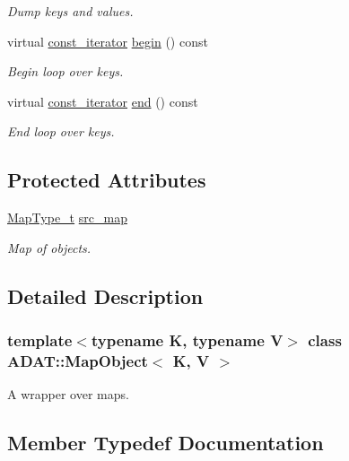\begin{DoxyCompactItemize}
\begin{DoxyCompactList}\small\item\em Dump keys and values. \end{DoxyCompactList}\item 
virtual \mbox{\hyperlink{classADAT_1_1MapObject_a4622cd7d3b6fed18fe226d28091cc6c8}{const\+\_\+iterator}} \mbox{\hyperlink{classADAT_1_1MapObject_a7f4f6830f0efcc2fcd7bb2aebe0b0c95}{begin}} () const
\begin{DoxyCompactList}\small\item\em Begin loop over keys. \end{DoxyCompactList}\item 
virtual \mbox{\hyperlink{classADAT_1_1MapObject_a4622cd7d3b6fed18fe226d28091cc6c8}{const\+\_\+iterator}} \mbox{\hyperlink{classADAT_1_1MapObject_a1162459ba16798247ab64ee38be25bca}{end}} () const
\begin{DoxyCompactList}\small\item\em End loop over keys. \end{DoxyCompactList}\end{DoxyCompactItemize}
\subsection*{Protected Attributes}
\begin{DoxyCompactItemize}
\item 
\mbox{\hyperlink{classADAT_1_1MapObject_ad6a4952087d3de5a43d08b2ea2ad270b}{Map\+Type\+\_\+t}} \mbox{\hyperlink{classADAT_1_1MapObject_af97a2c41e290158ccab37c2e52383194}{src\+\_\+map}}
\begin{DoxyCompactList}\small\item\em Map of objects. \end{DoxyCompactList}\end{DoxyCompactItemize}


\subsection{Detailed Description}
\subsubsection*{template$<$typename K, typename V$>$\newline
class A\+D\+A\+T\+::\+Map\+Object$<$ K, V $>$}

A wrapper over maps. 

\subsection{Member Typedef Documentation}
\mbox{\label{classADAT_1_1MapObject_a4622cd7d3b6fed18fe226d28091cc6c8}} 
